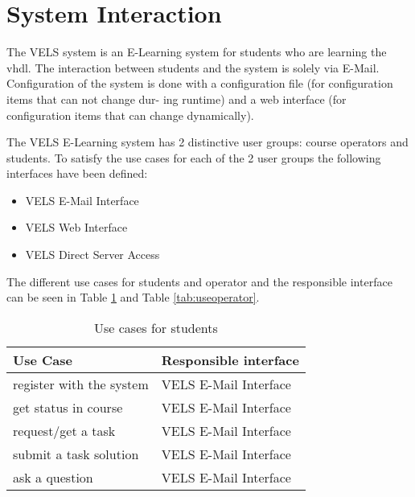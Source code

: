 \section{System Interaction} \label{system_interaction}
The VELS system is an E-Learning system for students who are learning the \gls{vhdl}. The
interaction between students and the system is solely via E-Mail. Configuration of the
system is done with a configuration file (for configuration items that can not change dur-
ing runtime) and a web interface (for configuration items that can change dynamically).

The VELS E-Learning system has 2 distinctive user groups: course operators and students. 
To satisfy the use cases for each of the 2 user groups the following interfaces have
been defined:
\begin{itemize}
\item VELS E-Mail Interface
\item VELS Web Interface
\item VELS Direct Server Access
\end{itemize} 

The different use cases for students and operator and the responsible interface can be 
seen in Table \ref{tab:usestudent} and Table \ref{tab:useoperator}.

\begin{table}[h]
\centering
\begin{tabular}{||l | l||} 
    \hline
    Use Case & Responsible interface \\ [0.5ex] 
    \hline\hline
    register with the system & VELS E-Mail Interface
    \\
    \hline
    get status in course & VELS E-Mail Interface 
    \\
    \hline
    request/get a task & VELS E-Mail Interface 
    \\
    \hline
    submit a task solution & VELS E-Mail Interface
    \\
    \hline
    ask a question & VELS E-Mail Interface
    \\
    \hline
\end{tabular}
\caption{Use cases for students}
\label{tab:usestudent}
\end{table}


